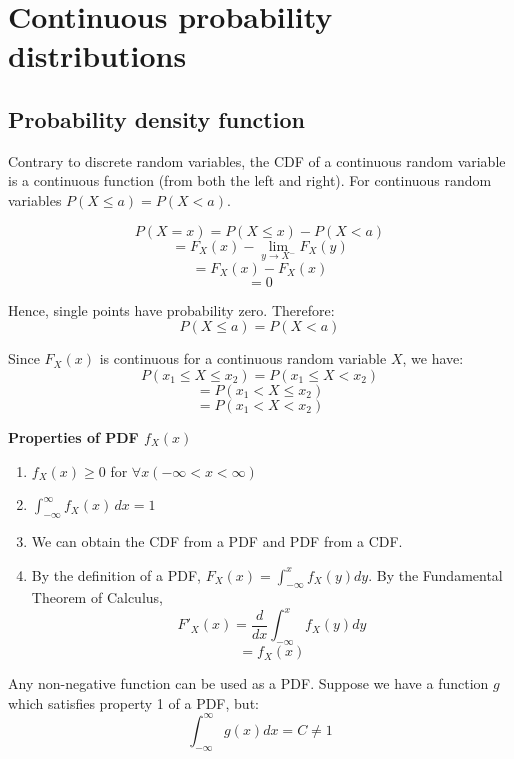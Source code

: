 
\chapter{Continuous probability distributions}

\section{Probability density function}


Contrary to discrete random variables, the CDF of a continuous random variable is a continuous function (from both the left and right). For continuous random variables $P(X \le a) = P(X < a)$. 

$$P(X = x) = P(X \le x) - P(X < a)$$
$$= F_X (x) - \lim_{y \rightarrow X^-} F_X (y)$$
$$= F_X (x) - F_X (x)$$
$$= 0$$

Hence, single points have probability zero. Therefore:
$$P(X \le a) = P(X < a)$$

Since $F_X (x)$ is continuous for a continuous random variable $X$, we have:
$$P(x_1 \le X \le x_2) = P(x_1 \le X < x_2)$$
$$=P(x_1 < X \le x_2)$$
$$=P(x_1 < X < x_2)$$


\textbf{Properties of PDF $f_X (x)$}
\begin{enumerate}
    \item $f_X (x) \ge 0$ for $\forall{x} (- \infty < x < \infty)$
    \item $\int_{-\infty}^{\infty} f_X (x) \,dx = 1$
    \item We can obtain the CDF from a PDF and PDF from a CDF.
    \item By the definition of a PDF, $F_X (x) = \int_{-\infty}^{x} f_X (y) dy$. By the Fundamental Theorem of Calculus,
    $$F'_X(x) = \frac{d}{dx} \int_{-\infty}^{x} f_X (y) dy$$
    $$ = f_X (x)$$
\end{enumerate}

Any non-negative function can be used as a PDF. Suppose we have a function $g$ which satisfies property 1 of a PDF, but:
$$\int_{-\infty}^{\infty} g(x) dx = C \not = 1$$

